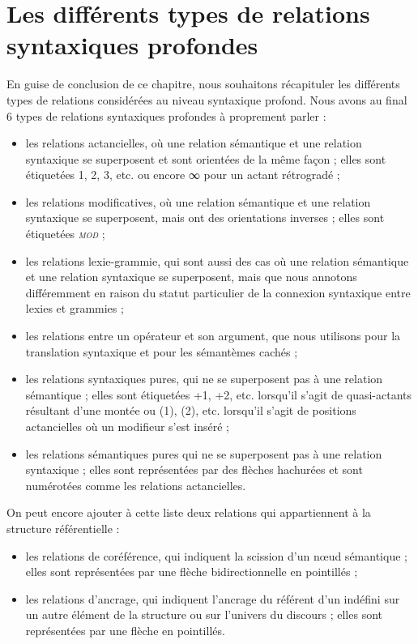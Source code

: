 \section{Les différents types de relations syntaxiques profondes}
En guise de conclusion de ce chapitre, nous souhaitons récapituler les différents types de relations considérées au niveau syntaxique profond. Nous avons au final 6 types de relations syntaxiques profondes à proprement parler :

\begin{itemize}
\item	les relations actancielles, où une relation sémantique et une relation syntaxique se superposent et sont orientées de la même façon ; elles sont étiquetées 1, 2, 3, etc. ou encore ∞ pour un actant rétrogradé ;
\item	les relations modificatives, où une relation sémantique et une relation syntaxique se superposent, mais ont des orientations inverses ; elles sont étiquetées \textit{\textsc{mod}} ;
\item	les relations lexie-grammie, qui sont aussi des cas où une relation sémantique et une relation syntaxique se superposent, mais que nous annotons différemment en raison du statut particulier de la connexion syntaxique entre lexies et grammies ;
\item	les relations entre un opérateur et son argument, que nous utilisons pour la translation syntaxique et pour les sémantèmes cachés ;
\item	les relations syntaxiques pures, qui ne se superposent pas à une relation sémantique ; elles sont étiquetées +1, +2, etc. lorsqu'il s'agit de quasi-actants résultant d'une montée ou (1), (2), etc. lorsqu'il s'agit de positions actancielles où un modifieur s'est inséré ;
\item	les relations sémantiques pures qui ne se superposent pas à une relation syntaxique ; elles sont représentées par des flèches hachurées et sont numérotées comme les relations actancielles.
\end{itemize}

On peut encore ajouter à cette liste deux relations qui appartiennent à la structure référentielle :

\begin{itemize}
\item	les relations de coréférence, qui indiquent la scission d’un nœud sémantique ; elles sont représentées par une flèche bidirectionnelle en pointillés ;
\item	les relations d’ancrage, qui indiquent l’ancrage du référent d’un indéfini sur un autre élément de la structure ou sur l’univers du discours ; elles sont représentées par une flèche en pointillés.
\end{itemize}

